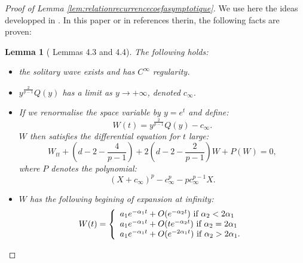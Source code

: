 \documentclass[11pt,a4paper,reqno]{amsart}
\newtheorem{lemma}[theorem]{Lemma}
\theoremstyle{remark}
\numberwithin{equation}{section}
\begin{document}
\begin{appendix}
\begin{proof}[Proof of Lemma \ref{lem:relationrecurrencecoefasymptotique}]
We use here the ideas developped in \cite{YiLi}. In this paper or in references therin, the following facts are proven:
\begin{lemma}[\cite{YiLi} Lemmas 4.3 and 4.4] The following holds:
\begin{itemize} 
\item[(i)] the solitary wave exists and has $C^{\infty}$ regularity.
\item[(ii)] $y^{\frac{2}{p-1}}Q(y)$ has a limit as $y\rightarrow +\infty$, denoted $c_{\infty}$.
\item[(iii)] If we renormalise the space variable by $y=e^t$ and define:
\begin{equation}
W(t)=y^{\frac{2}{p-1}}Q(y)-c_{\infty} .
\end{equation}
 $W$ then satisfies the differential equation for $t$ large:
\begin{equation}\label{eq:equadiffdeW}
W_{tt}+\left(d-2-\frac{4}{p-1}\right)+2\left(d-2-\frac{2}{p-1}\right)W+P(W)=0 ,
\end{equation}
where $P$ denotes the polynomial:
\begin{equation} \label{annexe:eq:expression P}
(X+c_{\infty})^p-c_{\infty}^p-pc_{\infty}^{p-1}X.
\end{equation}
\item[(iv)] $W$ has the following begining of expansion at infinity:
\begin{equation}
W(t)=\left\{ \begin{array}{l l} 
a_1 e^{-\alpha_1t}+O(e^{-\alpha_2 t}) \ \text{if} \ \alpha_2<2\alpha_1 \\
a_1 e^{-\alpha_1t}+O(te^{-\alpha_2 t}) \ \text{if} \ \alpha_2=2\alpha_1 \\
a_1 e^{-\alpha_1t}+O(e^{-2\alpha_1 t}) \ \text{if} \ \alpha_2>2\alpha_1 .
\end{array}
\right.
\end{equation}
\end{itemize}
\end{lemma}


\end{proof}
\end{appendix}
\end{document}
